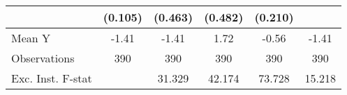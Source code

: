 {\begin{tabular}{l*{5}{c}}
            &     (0.105)         &     (0.463)         &     (0.482)         &     (0.210)         &                     \\
\midrule
Mean Y      &       -1.41         &       -1.41         &        1.72         &       -0.56         &       -1.41         \\
Observations&         390         &         390         &         390         &         390         &         390         \\
Exc. Inst. F-stat&                     &      31.329         &      42.174         &      73.728         &      15.218         \\
\bottomrule
\end{tabular}
}
